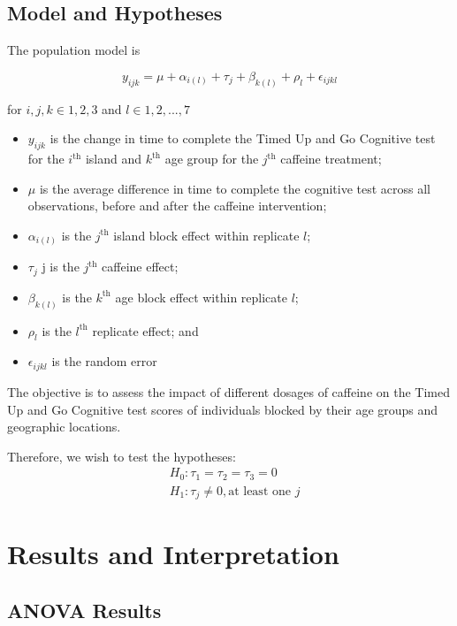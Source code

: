 \documentclass[11pt,a4paper,twoside]{tau-book}
\begin{document}
\subsection{Model and Hypotheses}

The population model is 

$$
    y_{ijk} = \mu + \alpha_{i(l)} + \tau_{j} + \beta_{k(l)} + \rho_{l} + \epsilon_{ijkl}
$$


for $i, j, k \in 1, 2, 3$ and $l \in 1, 2, ..., 7$

\begin{itemize}
    \item $y_{ijk}$ is the change in time to complete the Timed Up and Go Cognitive test for the $i^{\text{th}}$ island and $k^{\text{th}}$ age group for the $j^{\text{th}}$ caffeine treatment;
    \item $\mu$ is the average difference in time to complete the cognitive test across all observations, before and after the caffeine intervention;
    \item $\alpha_{i(l)}$ is the $j^{\text{th}}$ island block effect within replicate $l$;
    \item $\tau_{j}$ j is the $j^{\text{th}}$ caffeine effect;
    \item $\beta_{k(l)}$ is the $k^{\text{th}}$ age block effect within replicate $l$;
    \item $\rho_{l}$ is the $l^{\text{th}}$ replicate effect; and
    \item $\epsilon_{ijkl}$ is the random error

\end{itemize}

The objective is to assess the impact of different dosages of caffeine on the Timed Up and Go Cognitive test scores of individuals blocked by their age groups and geographic locations.

Therefore, we wish to test the hypotheses:
\begin{align*}
    &H_0: \tau_1 = \tau_2 = \tau_3 = 0 \\
    &H_1: \tau_j \ne 0, \text{at least one } j
\end{align*}


\section{Results and Interpretation}


\subsection{ANOVA Results}
\end{document}
